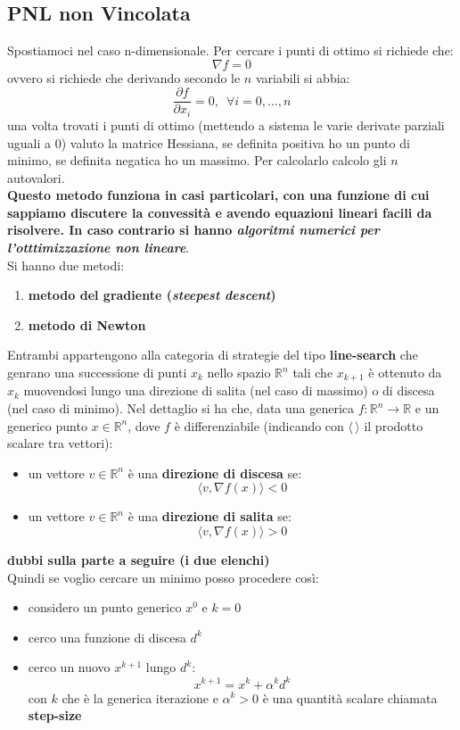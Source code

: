 \documentclass[a4paper,12pt, oneside]{book}
\begin{document}
\subsection{PNL non Vincolata}
Spostiamoci nel caso n-dimensionale. Per cercare i punti di ottimo si
richiede che:
\[\nabla f=0\]
ovvero si richiede che derivando secondo le $n$ variabili si abbia:
\[\frac{\partial f}{\partial x_i}=0,\,\,\,\forall i=0,\ldots, n\]
una volta trovati i punti di ottimo (mettendo a sistema le varie
derivate parziali uguali a 0) valuto la matrice Hessiana, se
definita positiva ho un punto di minimo, se definita negatica ho un
massimo. Per calcolarlo calcolo gli $n$ autovalori.\\
\textbf{Questo metodo funziona in casi particolari, con una funzione
  di cui sappiamo discutere la convessità e avendo equazioni lineari
  facili da risolvere. In caso contrario si hanno \textit{algoritmi
    numerici per l'otttimizzazione non lineare}}.\\
Si hanno due metodi:
\begin{enumerate}
  \item \textbf{metodo del gradiente (\textit{steepest descent})}
  \item \textbf{metodo di Newton}
\end{enumerate}
Entrambi appartengono alla categoria di strategie del tipo
\textbf{line-search} che genrano una successione di punti $x_k$ nello
spazio $\mathbb{R}^n$ tali che $x_{k+1}$ è ottenuto da $x_k$
muovendosi lungo una direzione di salita (nel caso di massimo) o di
discesa (nel caso di minimo). Nel dettaglio si ha che, data una generica
$f:\mathbb{R}^n\to\mathbb{R}$ e un generico punto $x\in \mathbb{R}^n$,
dove $f$ è differenziabile (indicando con $\langle\,\rangle$ il
prodotto scalare tra vettori):
\begin{itemize}
  \item un vettore $v\in\mathbb{R}^n$ è una \textbf{direzione di
    discesa} se:
  \[\langle v,\nabla f(x) \rangle<0\]
  \item un vettore $v\in\mathbb{R}^n$ è una \textbf{direzione di
    salita} se:
  \[\langle v,\nabla f(x) \rangle>0\]
\end{itemize}
\newpage
\textbf{dubbi sulla parte a seguire (i due elenchi)\\}
Quindi se voglio cercare un minimo posso procedere così:
\begin{itemize}
  \item considero un punto generico $x^0$ e $k=0$
  \item cerco una funzione di discesa $d^k$
  \item cerco un nuovo $x^{k+1}$ lungo $d^k$:
  \[x^{k+1}=x^k+\alpha^kd^k\]
  con $k$ che è la generica iterazione e $\alpha^k>0$ è una quantità
  scalare chiamata \textbf{step-size} 
\end{itemize}
\end{document}
